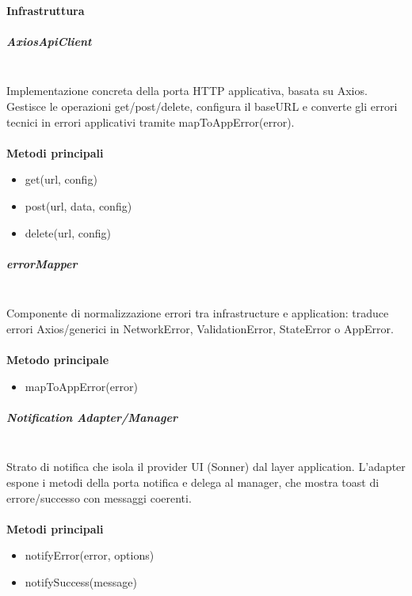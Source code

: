 \documentclass[a4paper,12pt]{article}
\begin{document}
            \paragraph{Infrastruttura}
                \subparagraph{AxiosApiClient}\mbox{}\\
                Implementazione concreta della porta HTTP applicativa, basata su Axios. Gestisce le operazioni {\ttfamily get/post/delete}, configura il {\ttfamily baseURL} e converte gli errori tecnici in errori applicativi tramite {\ttfamily mapToAppError(error)}.\\\\
                \textbf{Metodi principali}
                \begin{itemize}
                    \item {\ttfamily get(url, config)}
                    \item {\ttfamily post(url, data, config)}
                    \item {\ttfamily delete(url, config)}
                \end{itemize}
                
                \subparagraph{errorMapper}\mbox{}\\
                Componente di normalizzazione errori tra infrastructure e application: traduce errori Axios/generici in {\ttfamily NetworkError}, {\ttfamily ValidationError}, {\ttfamily StateError} o {\ttfamily AppError}.\\\\
                \textbf{Metodo principale}
                \begin{itemize}
                    \item {\ttfamily mapToAppError(error)}
                \end{itemize}
                
                \subparagraph{Notification Adapter/Manager}\mbox{}\\
                Strato di notifica che isola il provider UI (Sonner) dal layer application. L'adapter espone i metodi della porta notifica e delega al manager, che mostra toast di errore/successo con messaggi coerenti.\\\\
                \textbf{Metodi principali}
                \begin{itemize}
                    \item {\ttfamily notifyError(error, options)}
                    \item {\ttfamily notifySuccess(message)}
                \end{itemize}
\end{document}

